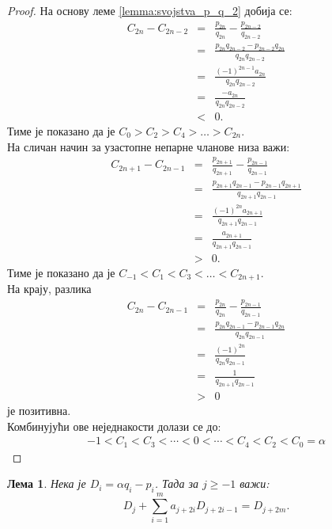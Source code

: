\documentclass[a4paper]{article}
\newtheorem{lemma}{Лема}
\begin{document}
\begin{proof}
	На основу леме \ref{lemma:svojstva_p_q_2} добија се:
	\begin{eqnarray*}
		C_{2n} - C_{2n-2} &=& \frac{p_{2n}}{q_{2n}} - \frac{p_{2n-2}}{q_{2n-2}}\\
						  &=& \frac{p_{2n}q_{2n-2} - p_{2n-2}q_{2n}}{q_{2n}q_{2n-2}}\\
						  &=& \frac{(-1)^{2n-1}a_{2n}}{q_{2n}q_{2n-2}}\\
						  &=& \frac{-a_{2n}}{q_{2n}q_{2n-2}}\\
						  &<& 0.
	\end{eqnarray*}
	Тиме је показано да је $ C_{0} > C_{2} > C_{4} > \ldots > C_{2n} $.\\
	На сличан начин за узастопне непарне чланове низа важи:
	\begin{eqnarray*}
		C_{2n+1} - C_{2n-1} &=& \frac{p_{2n+1}}{q_{2n+1}} - \frac{p_{2n-1}}{q_{2n-1}}\\
		&=& \frac{p_{2n+1}q_{2n-1} - p_{2n-1}q_{2n+1}}{q_{2n+1}q_{2n-1}}\\
		&=& \frac{(-1)^{2n}a_{2n+1}}{q_{2n+1}q_{2n-1}}\\
		&=& \frac{a_{2n+1}}{q_{2n+1}q_{2n-1}}\\
		&>& 0.
	\end{eqnarray*}
	Тиме је показано да је $ C_{-1} < C_{1} < C_{3} < \ldots < C_{2n+1} $.\\
	На крају, разлика
	\begin{eqnarray*}
		C_{2n} - C_{2n-1} &=& \frac{p_{2n}}{q_{2n}} - \frac{p_{2n-1}}{q_{2n-1}}\\
		&=& \frac{p_{2n}q_{2n-1} - p_{2n-1}q_{2n}}{q_{2n}q_{2n-1}}\\
		&=& \frac{(-1)^{2n}}{q_{2n}q_{2n-1}}\\
		&=& \frac{1}{q_{2n+1}q_{2n-1}}\\
		&>& 0
	\end{eqnarray*}
	је позитивна.\\
	Комбинујући ове неједнакости долази се до:
	\begin{eqnarray*}
		-1 < C_{1} < C_{3} < \cdots < 0 < \cdots < C_{4} < C_{2} < C_{0} = \alpha
	\end{eqnarray*}	
\end{proof}

\begin{lemma}
	\label{lemma:svojstva_konvergenata_2}
	Нека је $ D_{i} = \alpha q_{i} - p_{i} $. Тада за $ j \ge -1 $ важи:
	\begin{displaymath}
		D_{j} + \sum_{i=1}^{m} a_{j+2i}D_{j+2i-1} = D_{j+2m}.
	\end{displaymath}
\end{lemma}
\end{document}
